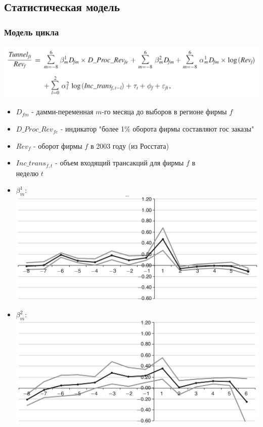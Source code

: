 \subsection{Статистическая модель}
\begin{frame}
\frametitle{Модель цикла}

\includegraphics[scale=0.18]{images/cycle1}
\begin{itemize}
	\item $D_{fm}$ - дамми-переменная $m$-го месяца до выборов в регионе фирмы $f$
	\item $D\_Proc\_Rev_{fe}$ - индикатор "более 1\% оборота фирмы составляют гос заказы"
	\item $Rev_{f}$ - оборот фирмы $f$ в 2003 году (из Росстата)
	\item $Inc\_trans_{f,t}$ - объем входящий трансакций для фирмы $f$ в \\неделю $t$
\end{itemize}
\end{frame}

\begin{frame}
\begin{itemize}
	\item $\beta^1_m$:\\
		\includegraphics[scale=0.15]{images/el_effect_beta1}
	
	\item $\beta^2_m$:\\
		\includegraphics[scale=0.15]{images/el_effect_beta2}
\end{itemize}
\end{frame}

